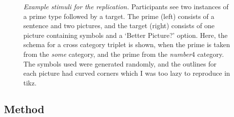 \documentclass[10pt]{article}
\begin{document}
\begin{multicols}{2}
\begin{figure}[ht]
  \caption{\emph{Example stimuli for the replication.} Participants see two instances of a prime type followed by a target.
    The prime (left) consists of a sentence and two pictures, and the target (right) consists of one picture containing symbols and a `Better Picture?' option.
    Here, the schema for a cross category triplet is shown, when the prime is taken from the \emph{some} category, and the prime from the \emph{number}4 category.
    The symbols used were generated randomly, and the outlines for each picture had curved corners which I was too lazy to reproduce in tikz.
  }
\end{figure}

\subsection{Method}
\label{sec:method}



\end{multicols}
\end{document}
